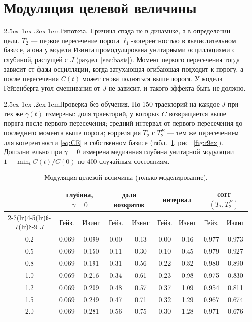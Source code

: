 \documentclass[12pt,a4paper]{report}
\makeatletter
\renewcommand\paragraph{\@startsection{paragraph}{4}{\z@}%
  {2.5ex \@plus1ex \@minus.2ex}{-1em}{\normalfont\normalsize\bfseries}}
\numberwithin{equation}{chapter}
\makeatother
\begin{document}
\section{Модуляция целевой величины}
\label{sec:r9}

\paragraph{Гипотеза.} Причина спада не в динамике, а в определении цели. $T_2$
--- первое пересечение порога $\ell_1$-когерентностью в вычислительном базисе,
а она у модели Изинга промодулирована унитарными осцилляциями с глубиной,
растущей с $J$ (раздел~\ref{sec:basis}). Момент первого пересечения тогда
зависит от фазы осцилляции, когда затухающая огибающая подходит к порогу,
а после пересечения $C(t)$ может снова подняться выше порога. У модели
Гейзенберга угол смешивания от $J$ не зависит, и такого эффекта быть не
должно.

\paragraph{Проверка без обучения.} По 150 траекторий на каждое $J$ при тех же
$\gamma(t)$ измерены: доля траекторий, у которых $C$ возвращается выше порога
после первого пересечения; средний интервал от первого пересечения до
последнего момента выше порога; корреляция $T_2$ с $T_2^E$ --- тем же
пересечением для когерентности \eqref{eq:CE} в собственном базисе
(табл.~\ref{tab:r9}, рис.~\ref{fig:r9ex}). Дополнительно при $\gamma=0$
измерена медианная глубина унитарной модуляции $1-\min_tC(t)/C(0)$ по 400
случайным состояниям.

\begin{table}[h]
\centering
\caption{Модуляция целевой величины (только моделирование).}
\label{tab:r9}
\small
\begin{tabular}{@{}c cc cc cc cc@{}}
\toprule
 & \multicolumn{2}{c}{глубина, $\gamma=0$} & \multicolumn{2}{c}{доля возвратов}
 & \multicolumn{2}{c}{интервал} & \multicolumn{2}{c}{corr$(T_2,T_2^E)$} \\
\cmidrule(lr){2-3}\cmidrule(lr){4-5}\cmidrule(lr){6-7}\cmidrule(lr){8-9}
$J$ & Гейз. & Изинг & Гейз. & Изинг & Гейз. & Изинг & Гейз. & Изинг \\
\midrule
0.2 & 0.069 & 0.099 & 0.00 & 0.13 & 0.00 & 0.16 & 0.977 & 0.973 \\
0.5 & 0.069 & 0.150 & 0.11 & 0.30 & 0.10 & 0.45 & 0.979 & 0.927 \\
0.8 & 0.069 & 0.191 & 0.31 & 0.56 & 0.22 & 0.82 & 0.980 & 0.890 \\
1.0 & 0.069 & 0.216 & 0.34 & 0.61 & 0.23 & 0.98 & 0.975 & 0.830 \\
1.2 & 0.069 & 0.209 & 0.48 & 0.57 & 0.37 & 1.09 & 0.954 & 0.811 \\
1.5 & 0.069 & 0.249 & 0.47 & 0.71 & 0.32 & 1.29 & 0.967 & 0.674 \\
2.0 & 0.069 & 0.281 & 0.56 & 0.75 & 0.30 & 1.28 & 0.971 & 0.676 \\
\bottomrule
\end{tabular}
\end{table}
\end{document}
